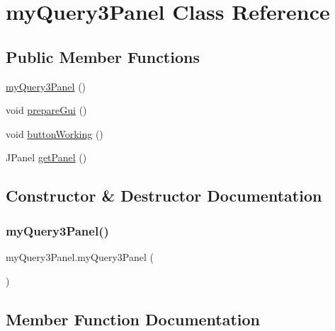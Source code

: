 \hypertarget{classmy_query3_panel}{}\section{my\+Query3\+Panel Class Reference}
\label{classmy_query3_panel}
\subsection*{Public Member Functions}
\begin{DoxyCompactItemize}
\item 
\hyperlink{classmy_query3_panel_a41792f89e40b96e00d365f08c64ede34}{my\+Query3\+Panel} ()
\item 
void \hyperlink{classmy_query3_panel_a0ba85999b328528fb1255d54f9e35adf}{prepare\+Gui} ()
\item 
void \hyperlink{classmy_query3_panel_a733fe7c07a4083484bde4cf976ef62dc}{button\+Working} ()
\item 
J\+Panel \hyperlink{classmy_query3_panel_a7e32c709687bc0e276dbfb4abc101c83}{get\+Panel} ()
\end{DoxyCompactItemize}


\subsection{Constructor \& Destructor Documentation}
\hypertarget{classmy_query3_panel_a41792f89e40b96e00d365f08c64ede34}{}\label{classmy_query3_panel_a41792f89e40b96e00d365f08c64ede34} 
\subsubsection{\texorpdfstring{my\+Query3\+Panel()}{myQuery3Panel()}}
{\footnotesize\ttfamily my\+Query3\+Panel.\+my\+Query3\+Panel (\begin{DoxyParamCaption}{ }\end{DoxyParamCaption})}



\subsection{Member Function Documentation}
\hypertarget{classmy_query3_panel_a733fe7c07a4083484bde4cf976ef62dc}{}\label{classmy_query3_panel_a733fe7c07a4083484bde4cf976ef62dc} 
